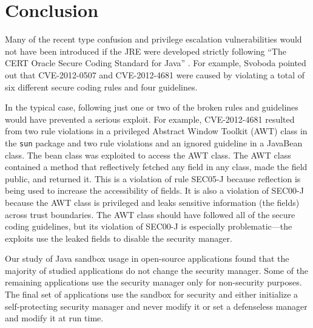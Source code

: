 \documentclass{sig-alternate}
\begin{document}
\section{Conclusion}

Many of the recent type confusion and privilege escalation vulnerabilities
would not have been introduced if the JRE were developed strictly
following ``The CERT Oracle Secure Coding Standard for Java'' \cite{long_cert_2011}.
For example, Svoboda \cite{svoboda_anatomy_blog_2013,svoboda_anatomy_2014}
pointed out that CVE-2012-0507 and CVE-2012-4681 were caused by violating
a total of six different secure coding rules and four guidelines. 

In the typical case, following just one or two of the broken rules
and guidelines would have prevented a serious exploit. For example,
CVE-2012-4681 resulted from two rule violations in a privileged Abstract
Window Toolkit (AWT) class in the \texttt{sun} package and two rule
violations and an ignored guideline in a JavaBean class. The bean
class was exploited to access the AWT class. The AWT class contained
a method that reflectively fetched any field in any class, made the
field public, and returned it. This is a violation of rule SEC05-J
because reflection is being used to increase the accessibility of
fields. It is also a violation of SEC00-J because the AWT class is
privileged and leaks sensitive information (the fields) across trust
boundaries. The AWT class should have followed all of the secure coding
guidelines, but its violation of SEC00-J is especially problematic---the
exploits use the leaked fields to disable the security manager. 


Our study of Java sandbox usage in open-source applications found
that the majority of studied applications do not change the security
manager. Some of the remaining applications use the security manager
only for non-security purposes. The final set of applications use
the sandbox for security and either initialize a self-protecting security
manager and never modify it or set a defenseless manager and modify
it at run time. 
\end{document}
